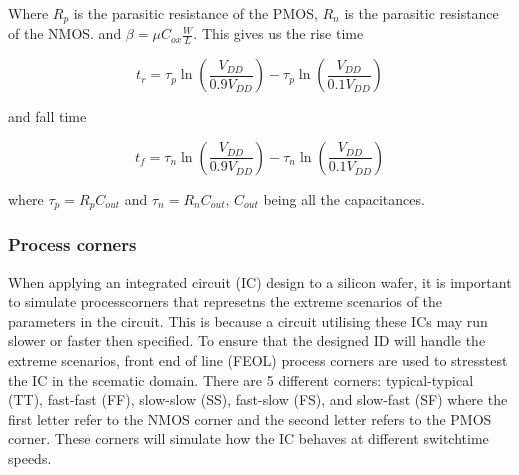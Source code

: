 Where $R_p$ is the parasitic resistance of the PMOS, $R_n$ is the parasitic resistance of the NMOS. and $\beta=\mu C_{ox}\frac{W}{L}$. This gives us the rise time

\begin{equation}
    t_r=\tau_p \ln \left(\frac{V_{DD}}{0.9V_{DD}}\right)-\tau_p \ln \left(\frac{V_{DD}}{0.1V_{DD}}\right)
    \label{eq:risetime}
\end{equation}

and fall time

\begin{equation}
    t_f=\tau_n \ln \left(\frac{V_{DD}}{0.9V_{DD}}\right)-\tau_n \ln \left(\frac{V_{DD}}{0.1V_{DD}}\right)
    \label{eq:falltime}
\end{equation}

where $\tau_p=R_pC_{out}$ and $\tau_n=R_nC_{out}$, $C_{out}$ being all the capacitances. \cite{departmentofelectronicsystemsntnu_2023_delay}

\subsubsection{Process corners}
When applying an integrated circuit (IC) design to a silicon wafer, it is important to simulate processcorners that represetns the extreme scenarios of the parameters in the circuit. This is because a circuit utilising these ICs may run slower or faster then specified. To ensure that the designed ID will handle the extreme scenarios,  front end of line (FEOL) process corners are used to stresstest the IC in the scematic domain. There are 5 different corners: typical-typical (TT), fast-fast (FF), slow-slow (SS), fast-slow (FS), and slow-fast (SF) where the first letter refer to the NMOS corner and the second letter refers to the PMOS corner. These corners will simulate how the IC behaves at different switchtime speeds.